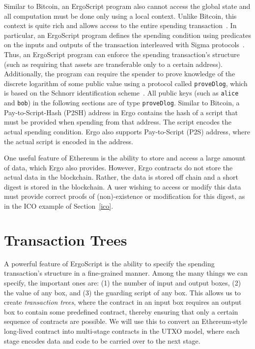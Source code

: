 \documentclass[runningheads]{llncs}
\newcommand{\langname}{ErgoScript\xspace}
\begin{document}
Similar to Bitcoin, an \langname program also cannot access the global state and all computation must be done only using a local context. Unlike Bitcoin, this context is quite rich and allows access to the entire spending transaction~\cite{tutorial}. 
In particular, an \langname program defines the spending condition using predicates on the inputs and outputs of the transaction interleaved with Sigma protocols~\cite{Dam10}. Thus, an \langname program can enforce the spending transaction's structure (such as requiring that assets are transferable only to a certain address). Additionally, the program can require the spender to prove knowledge of the discrete logarithm of some public value using a protocol called \texttt{proveDlog}, which is based on the Schnorr identification scheme~\cite{Dam10}. All public keys (such as \texttt{alice} and \texttt{bob}) in the following sections are of type \texttt{proveDlog}. Similar to Bitcoin, a Pay-to-Script-Hash (P2SH) address in Ergo contains the hash of a script that must be provided when spending from that address. The script encodes the actual spending condition. Ergo also supports Pay-to-Script (P2S) address, where the actual script is encoded in the address. 

 
 One useful feature of Ethereum is the ability to store and access a large amount of data, which Ergo also provides.
 However, Ergo contracts do not store the actual data in the blockchain. Rather, the data is stored off chain and a short digest is stored in the blockchain. A user wishing to access or modify this data must provide correct proofs of (non)-existence or modification for this digest, as in the ICO example of Section~\ref{ico}. 

\section{Transaction Trees}

A powerful feature of \langname is the ability to specify the spending transaction's structure in a fine-grained manner. 
Among the many things we can specify, the important ones are: (1) the number of input and output boxes, (2) the value of any box, and (3) the guarding script of any box. This allows us to create {\em transaction trees}, where the contract in an input box requires an output box to contain some predefined contract, thereby ensuring that only a certain sequence of contracts are possible. 
We will use this to convert an Ethereum-style long-lived contract into multi-stage contracts in the UTXO model, where each stage encodes data and code to be carried over to the next stage. 
\end{document}
